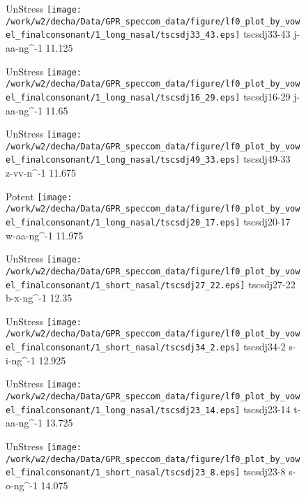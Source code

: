 \documentclass{article}
\begin{document}
\begin{figure}[t]
\begin{minipage}[b]{.24\textwidth}
UnStress
\centering
\texttt{[image: /work/w2/decha/Data/GPR\_speccom\_data/figure/lf0\_plot\_by\_vowel\_finalconsonant/1\_long\_nasal/tscsdj33\_43.eps]}
tscsdj33-43 j-aa-ng\textasciicircum-1 11.125
\end{minipage}
\begin{minipage}[b]{.24\textwidth}
UnStress
\centering
\texttt{[image: /work/w2/decha/Data/GPR\_speccom\_data/figure/lf0\_plot\_by\_vowel\_finalconsonant/1\_long\_nasal/tscsdj16\_29.eps]}
tscsdj16-29 j-aa-ng\textasciicircum-1 11.65
\end{minipage}
\begin{minipage}[b]{.24\textwidth}
UnStress
\centering
\texttt{[image: /work/w2/decha/Data/GPR\_speccom\_data/figure/lf0\_plot\_by\_vowel\_finalconsonant/1\_long\_nasal/tscsdj49\_33.eps]}
tscsdj49-33 z-vv-n\textasciicircum-1 11.675
\end{minipage}
\begin{minipage}[b]{.24\textwidth}
\colorbox{Apricot}{Potent}
\centering
\texttt{[image: /work/w2/decha/Data/GPR\_speccom\_data/figure/lf0\_plot\_by\_vowel\_finalconsonant/1\_long\_nasal/tscsdj20\_17.eps]}
tscsdj20-17 w-aa-ng\textasciicircum-1 11.975
\end{minipage}
\end{figure}

\begin{figure}[t]
\begin{minipage}[b]{.24\textwidth}
UnStress
\centering
\texttt{[image: /work/w2/decha/Data/GPR\_speccom\_data/figure/lf0\_plot\_by\_vowel\_finalconsonant/1\_short\_nasal/tscsdj27\_22.eps]}
tscsdj27-22 b-x-ng\textasciicircum-1 12.35
\end{minipage}
\begin{minipage}[b]{.24\textwidth}
UnStress
\centering
\texttt{[image: /work/w2/decha/Data/GPR\_speccom\_data/figure/lf0\_plot\_by\_vowel\_finalconsonant/1\_short\_nasal/tscsdj34\_2.eps]}
tscsdj34-2 s-i-ng\textasciicircum-1 12.925
\end{minipage}
\begin{minipage}[b]{.24\textwidth}
UnStress
\centering
\texttt{[image: /work/w2/decha/Data/GPR\_speccom\_data/figure/lf0\_plot\_by\_vowel\_finalconsonant/1\_long\_nasal/tscsdj23\_14.eps]}
tscsdj23-14 t-aa-ng\textasciicircum-1 13.725
\end{minipage}
\begin{minipage}[b]{.24\textwidth}
UnStress
\centering
\texttt{[image: /work/w2/decha/Data/GPR\_speccom\_data/figure/lf0\_plot\_by\_vowel\_finalconsonant/1\_short\_nasal/tscsdj23\_8.eps]}
tscsdj23-8 s-o-ng\textasciicircum-1 14.075
\end{minipage}
\end{figure}
\end{document}
